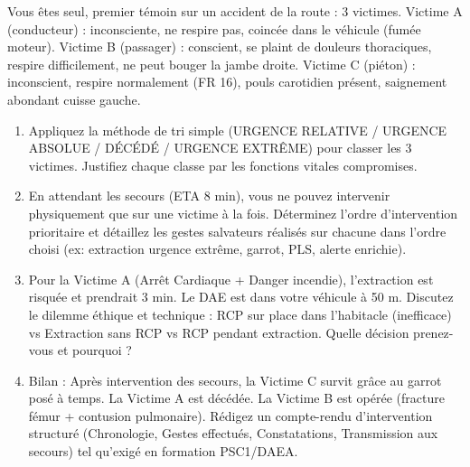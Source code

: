 \documentclass[11pt]{article}
\begin{document}
\begin{exercice}
Vous êtes seul, premier témoin sur un accident de la route : 3 victimes. Victime A (conducteur) : inconsciente, ne respire pas, coincée dans le véhicule (fumée moteur). Victime B (passager) : conscient, se plaint de douleurs thoraciques, respire difficilement, ne peut bouger la jambe droite. Victime C (piéton) : inconscient, respire normalement (FR 16), pouls carotidien présent, saignement abondant cuisse gauche.
\begin{enumerate}
    \item Appliquez la méthode de tri simple (URGENCE RELATIVE / URGENCE ABSOLUE / DÉCÉDÉ / URGENCE EXTRÊME) pour classer les 3 victimes. Justifiez chaque classe par les fonctions vitales compromises.
    \item En attendant les secours (ETA 8 min), vous ne pouvez intervenir physiquement que sur une victime à la fois. Déterminez l'ordre d'intervention prioritaire et détaillez les gestes salvateurs réalisés sur chacune dans l'ordre choisi (ex: extraction urgence extrême, garrot, PLS, alerte enrichie).
    \item Pour la Victime A (Arrêt Cardiaque + Danger incendie), l'extraction est risquée et prendrait 3 min. Le DAE est dans votre véhicule à 50 m. Discutez le dilemme éthique et technique : RCP sur place dans l'habitacle (inefficace) vs Extraction sans RCP vs RCP pendant extraction. Quelle décision prenez-vous et pourquoi ?
    \item Bilan : Après intervention des secours, la Victime C survit grâce au garrot posé à temps. La Victime A est décédée. La Victime B est opérée (fracture fémur + contusion pulmonaire). Rédigez un compte-rendu d'intervention structuré (Chronologie, Gestes effectués, Constatations, Transmission aux secours) tel qu'exigé en formation PSC1/DAEA.
\end{enumerate}
\end{exercice}
\end{document}
